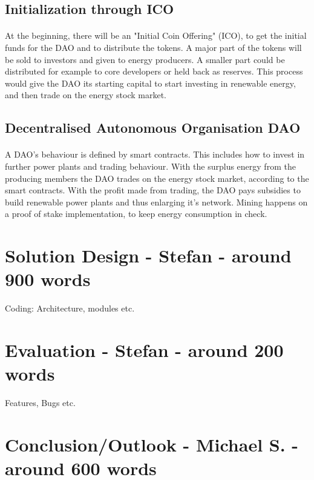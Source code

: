 \documentclass{scrartcl}
\begin{document}
	\subsection{Initialization through ICO}
	
	\paragraph{}
	At the beginning, there will be an "Initial Coin Offering" (ICO), to get the initial funds for the DAO and to distribute the tokens. A major part of the tokens will be sold to investors and given to energy producers. A smaller part could be distributed for example to core developers or held back as reserves. This process would give the DAO its starting capital to start investing in renewable energy, and then trade on the energy stock market. 
	\subsection{Decentralised Autonomous Organisation DAO}
	
	
	\paragraph{}
	A DAO's behaviour is defined by smart contracts. This includes how to invest in further power plants  and trading behaviour. With the surplus energy from the producing members the DAO trades on the energy stock market, according to the smart contracts. With the profit made from trading, the DAO pays subsidies to build renewable power plants and thus enlarging it's network. Mining happens on a proof of stake implementation, to keep energy consumption in check. 

    
   \section{Solution Design - Stefan - around 900 words}
   Coding: Architecture, modules etc.
   
   \section{Evaluation - Stefan - around 200 words}
	Features, Bugs etc.
	
    \section{Conclusion/Outlook - Michael S. - around 600 words}
\end{document}
